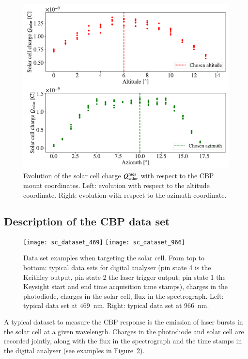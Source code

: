 \begin{figure}[h]
    \centering
    \includegraphics[width=\columnwidth]{fig/cross_solarcell.pdf}
    \caption{Evolution of the solar cell charge $Q_{\mathrm{solar}}^{\mathrm{mes}}$ with respect to the CBP mount coordinates. Left: evolution with respect to the altitude coordinate. Right: evolution with respect to the azimuth coordinate.}
    \label{fig:cross_sc}
\end{figure}


\subsection{Description of the CBP data set}
\label{sec:cbp_datadesc}

\begin{figure}[!h]
\centering
\texttt{[image: sc\_dataset\_469]}
\texttt{[image: sc\_dataset\_966]}
\caption{Data set examples when targeting the solar cell. From top to bottom: typical data sets for digital analyser (pin state 4 is the Keithley output, pin state 2 the laser trigger output, pin state 1 the Keysight start and end time acquisition time stamps), charges in the photodiode, charges in the solar cell, flux in the spectrograph. Left: typical data set at \SI{469}{\nm}. Right: typical data set at \SI{966}{\nm}.}\label{fig:sc_dataset_examples}
\end{figure}

A typical dataset to measure the CBP response is the emission of laser bursts in the solar cell at a given wavelength. Charges in the photodiode and solar cell are recorded jointly, along with the flux in the spectrograph and the time stamps in the digital analyser (see examples in Figure~\ref{fig:sc_dataset_examples}).

